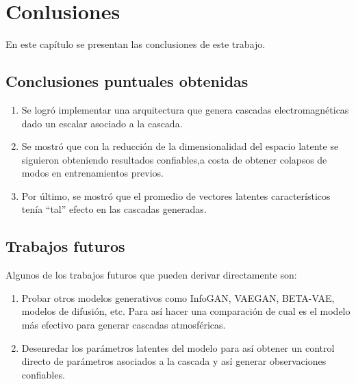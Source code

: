 
\chapter{Conlusiones} %

\label{Chapter6} %


En este capítulo se presentan las conclusiones de este trabajo.

\section{Conclusiones puntuales obtenidas}

\begin{enumerate}
    \item Se logró implementar una arquitectura que genera cascadas electromagnéticas dado un escalar asociado a la cascada.
    \item Se mostró que con la reducción de la dimensionalidad del espacio latente se siguieron obteniendo resultados confiables,a costa de obtener colapsos de modos en entrenamientos previos.
    \item Por último, se mostró que el promedio de vectores latentes característicos tenía “tal” efecto en las cascadas generadas.
\end{enumerate}

\section{Trabajos futuros}

Algunos de los trabajos futuros que pueden derivar directamente son:
\begin{enumerate}[label=\alph*)]
    \item Probar otros modelos generativos como InfoGAN, VAEGAN, BETA-VAE, modelos de difusión, etc. Para así hacer una comparación de cual es el modelo más efectivo para generar cascadas atmosféricas.
    \item Desenredar los parámetros latentes del modelo para así obtener un control directo de parámetros asociados a la cascada y así generar observaciones confiables.
\end{enumerate}